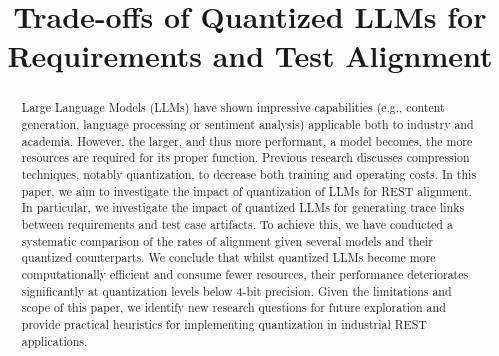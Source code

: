 \documentclass[conference]{IEEEtran}
\begin{document}
\title{Trade-offs of Quantized LLMs for Requirements and Test Alignment}

\author{
  \and
  \and
}

\maketitle

\begin{abstract}
Large Language Models (LLMs) have shown impressive capabilities (e.g., content
generation, language processing or sentiment analysis) applicable both to
industry and academia. However, the larger, and thus more performant, a model
becomes, the more resources are required for its proper function. Previous
research discusses compression techniques, notably quantization, to decrease
both training and operating costs. In this paper, we aim to investigate the
impact of quantization of LLMs for REST alignment. 
In particular, we investigate the impact of quantized LLMs for generating trace
links between requirements and test case artifacts. To achieve this, we have
conducted a systematic comparison of the rates of alignment given several models
and their quantized counterparts.
We conclude that whilst quantized LLMs become more computationally efficient and
consume fewer resources, their performance deteriorates significantly at
quantization levels below 4-bit precision. Given the limitations and scope of
this paper, we identify new research questions for future exploration and
provide practical heuristics for implementing quantization in industrial REST
applications.
\end{abstract}
\end{document}
